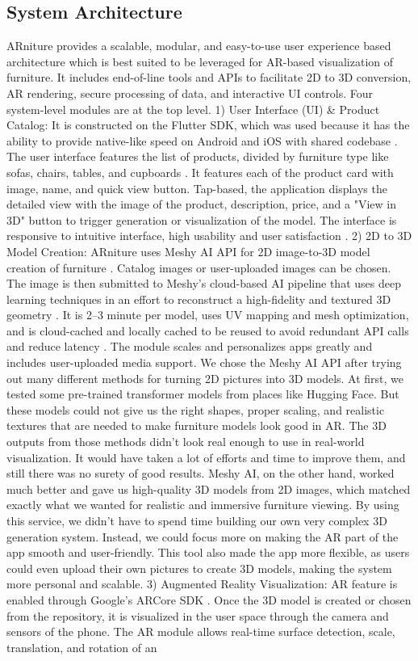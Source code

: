 \documentclass[12pt, a4paper]{article}
\begin{document}
\subsection{System Architecture}
ARniture provides a scalable, modular, and easy-to-use user experience based architecture which is best suited to be leveraged for AR-based visualization of furniture. It includes end-of-line tools and APIs to facilitate 2D to 3D conversion, AR rendering, secure processing of data, and interactive UI controls. Four system-level modules are at the top level. 1) User Interface (UI) \& Product Catalog: It is constructed on the Flutter SDK, which was used because it has the ability to provide native-like speed on Android and iOS with shared codebase \cite{ref3,ref9}. The user interface features the list of products, divided by furniture type like sofas, chairs, tables, and cupboards \cite{ref6}. It features each of the product card with image, name, and quick view button. Tap-based, the application displays the detailed view with the image of the product, description, price, and a "View in 3D" button to trigger generation or visualization of the model. The interface is responsive to intuitive interface, high usability and user satisfaction \cite{ref8}. 2) 2D to 3D Model Creation: ARniture uses Meshy AI API for 2D image-to-3D model creation of furniture \cite{ref5}. Catalog images or user-uploaded images can be chosen. The image is then submitted to Meshy's cloud-based AI pipeline that uses deep learning techniques in an effort to reconstruct a high-fidelity and textured 3D geometry \cite{ref12}. It is 2--3 minute per model, uses UV mapping and mesh optimization, and is cloud-cached and locally cached to be reused to avoid redundant API calls and reduce latency \cite{ref20}. The module scales and personalizes apps greatly and includes user-uploaded media support. We chose the Meshy AI API after trying out many different methods for turning 2D pictures into 3D models. At first, we tested some pre-trained transformer models from places like Hugging Face. But these models could not give us the right shapes, proper scaling, and realistic textures that are needed to make furniture models look good in AR. The 3D outputs from those methods didn't look real enough to use in real-world visualization. It would have taken a lot of efforts and time to improve them, and still there was no surety of good results. Meshy AI, on the other hand, worked much better and gave us high-quality 3D models from 2D images, which matched exactly what we wanted for realistic and immersive furniture viewing. By using this service, we didn't have to spend time building our own very complex 3D generation system. Instead, we could focus more on making the AR part of the app smooth and user-friendly. This tool also made the app more flexible, as users could even upload their own pictures to create 3D models, making the system more personal and scalable. 3) Augmented Reality Visualization: AR feature is enabled through Google's ARCore SDK \cite{ref2}. Once the 3D model is created or chosen from the repository, it is visualized in the user space through the camera and sensors of the phone. The AR module allows real-time surface detection, scale, translation, and rotation of an 
\end{document}
